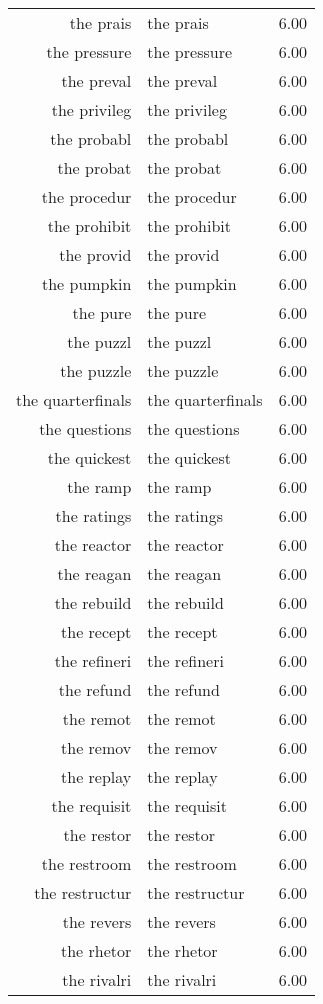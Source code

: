 \begin{table}[ht]
\begin{tabular}{rlr}
  the prais & the prais & 6.00 \\ 
  the pressure & the pressure & 6.00 \\ 
  the preval & the preval & 6.00 \\ 
  the privileg & the privileg & 6.00 \\ 
  the probabl & the probabl & 6.00 \\ 
  the probat & the probat & 6.00 \\ 
  the procedur & the procedur & 6.00 \\ 
  the prohibit & the prohibit & 6.00 \\ 
  the provid & the provid & 6.00 \\ 
  the pumpkin & the pumpkin & 6.00 \\ 
  the pure & the pure & 6.00 \\ 
  the puzzl & the puzzl & 6.00 \\ 
  the puzzle & the puzzle & 6.00 \\ 
  the quarterfinals & the quarterfinals & 6.00 \\ 
  the questions & the questions & 6.00 \\ 
  the quickest & the quickest & 6.00 \\ 
  the ramp & the ramp & 6.00 \\ 
  the ratings & the ratings & 6.00 \\ 
  the reactor & the reactor & 6.00 \\ 
  the reagan & the reagan & 6.00 \\ 
  the rebuild & the rebuild & 6.00 \\ 
  the recept & the recept & 6.00 \\ 
  the refineri & the refineri & 6.00 \\ 
  the refund & the refund & 6.00 \\ 
  the remot & the remot & 6.00 \\ 
  the remov & the remov & 6.00 \\ 
  the replay & the replay & 6.00 \\ 
  the requisit & the requisit & 6.00 \\ 
  the restor & the restor & 6.00 \\ 
  the restroom & the restroom & 6.00 \\ 
  the restructur & the restructur & 6.00 \\ 
  the revers & the revers & 6.00 \\ 
  the rhetor & the rhetor & 6.00 \\ 
  the rivalri & the rivalri & 6.00 \\ 

\end{tabular}
\end{table}
